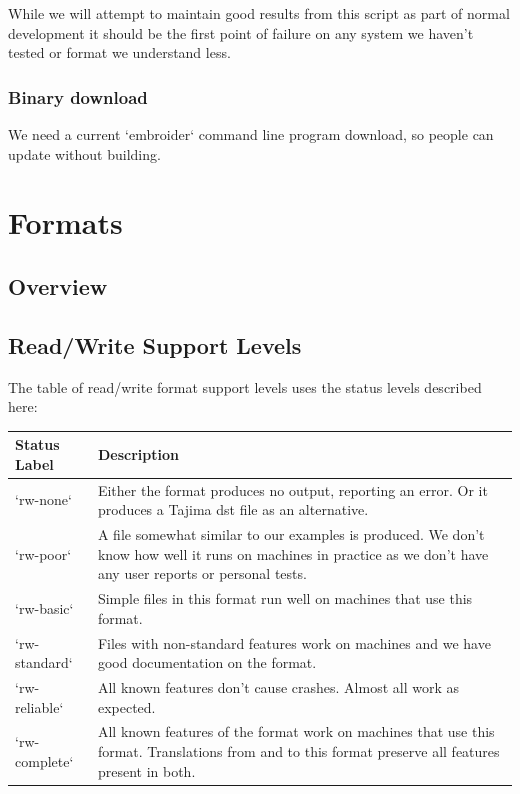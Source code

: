 \documentclass{report}
\begin{document}
While we will attempt to maintain good results from this script as part of normal development it should be the first point of failure on any system we haven't tested or format we understand less.

\subsection{Binary download}

We need a current `embroider` command line program download, so people can update
without building.

\chapter{Formats}

\section{Overview}

\section{Read/Write Support Levels}

The table of read/write format support levels uses the status levels described here:

\begin{longtable}{l p{8cm}}
Status Label & Description \\
\hline
`rw-none` & Either the format produces no output, reporting an error. Or it produces a Tajima dst file as an alternative. \\
`rw-poor` & A file somewhat similar to our examples is produced. We don't know how well it runs on machines in practice as we don't have any user reports or personal tests. \\
`rw-basic` & Simple files in this format run well on machines that use this format. \\
`rw-standard` & Files with non-standard features work on machines and we have good documentation on the format. \\
`rw-reliable` & All known features don't cause crashes. Almost all work as expected. \\
`rw-complete` & All known features of the format work on machines that use this format. Translations from and to this format preserve all features present in both.
\end{longtable}
\end{document}
